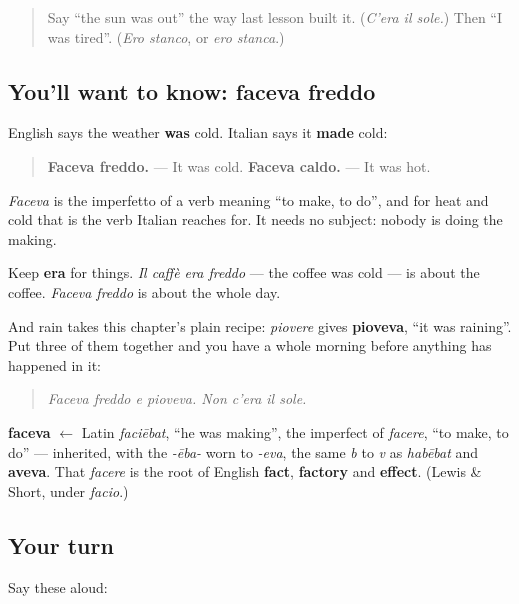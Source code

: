 \begin{quote}
Say \textquotedblleft{}the sun was out\textquotedblright{} the way last lesson built it. (\emph{C'era il sole.}) Then \textquotedblleft{}I was tired\textquotedblright{}. (\emph{Ero stanco}, or \emph{ero stanca}.)
\end{quote}

\subsection*{You'll want to know: faceva freddo}
English says the weather \textbf{was} cold. Italian says it \textbf{made} cold:

\begin{quote}
\textbf{Faceva freddo.} — It was cold. \textbf{Faceva caldo.} — It was hot.
\end{quote}

\emph{Faceva} is the imperfetto of a verb meaning \textquotedblleft{}to make, to do\textquotedblright{}, and for heat and cold that is the verb Italian reaches for. It needs no subject: nobody is doing the making.

Keep \textbf{era} for things. \emph{Il caffè era freddo} — the coffee was cold — is about the coffee. \emph{Faceva freddo} is about the whole day.

And rain takes this chapter's plain recipe: \emph{piovere} gives \textbf{pioveva}, \textquotedblleft{}it was raining\textquotedblright{}. Put three of them together and you have a whole morning before anything has happened in it:

\begin{quote}
\emph{Faceva freddo e pioveva. Non c'era il sole.}
\end{quote}

\begin{cousinweb}
\textbf{faceva} $\leftarrow$ Latin \emph{faciēbat}, \textquotedblleft{}he was making\textquotedblright{}, the imperfect of \emph{facere}, \textquotedblleft{}to make, to do\textquotedblright{} — inherited, with the \emph{-ēba-} worn to \emph{-eva}, the same \emph{b} to \emph{v} as \emph{habēbat} and \textbf{aveva}. That \emph{facere} is the root of English \textbf{fact}, \textbf{factory} and \textbf{effect}. (Lewis \& Short, under \emph{facio}.)
\end{cousinweb}

\subsection*{Your turn}
Say these aloud:


